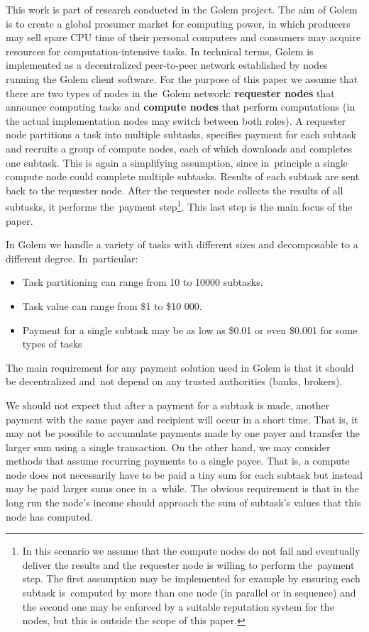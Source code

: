 \documentclass[a4paper]{article}
\begin{document}
    This work is part of research conducted in the Golem project. The aim of Golem is to create a global prosumer
    market for computing power, in which producers may sell spare CPU time of their personal computers and consumers
    may acquire resources for computation-intensive tasks. In technical terms, Golem is implemented as a decentralized
    peer-to-peer network established by nodes running the Golem client software. For the purpose of this paper
    we assume that there are two types of nodes in the~Golem network: \textbf{requester nodes} that announce computing
    tasks and \textbf{compute nodes} that perform computations (in the actual implementation nodes may switch between
    both roles).
    A requester node partitions a task into multiple subtasks, specifies payment for each subtask and recruits
    a group of compute nodes, each of which downloads and completes one subtask. This is again a simplifying
    assumption, since in~principle a single compute node could complete multiple subtasks.
    Results of each subtask are sent back to the requester node. After the requester node collects the results of all
    subtasks, it performs the~payment step\footnote{In this scenario we assume that the compute nodes do not fail
    and eventually deliver the results and the requester node is willing to perform the~payment step.
    The first assumption may be implemented for example by ensuring each subtask is~computed by more than one node
    (in parallel or in sequence) and the second one may be enforced by a suitable reputation system for the nodes,
    but this is outside the scope of this paper.}. This last step is the main focus of the paper.

    In Golem we handle a variety of tasks with different sizes and decomposable to a different degree. In~particular:
    \begin{itemize}
        \item Task partitioning can range from 10 to 10000 subtasks.
        \item Task value can range from \$1 to \$10 000.
        \item Payment for a single subtask may be as low as \$0.01 or even \$0.001 for some types of tasks
    \end{itemize}

    The main requirement for any payment solution used in Golem is that it should be decentralized and~not depend
    on any trusted authorities (banks, brokers).


    We should not expect that after a payment for a subtask is made, another payment with the same payer and recipient
    will occur in a short time. That is, it may not be possible to accumulate payments made by one payer and transfer
    the larger sum using a single transaction. On the other hand, we may consider methods that assume recurring
    payments to a single payee. That is, a compute node does not necessarily have to be paid a tiny sum for each
    subtask but instead may be paid larger sums once in~a~while. The obvious requirement is that in the long run
    the node's income should approach the sum of subtask’s values that this node has computed.
\end{document}
